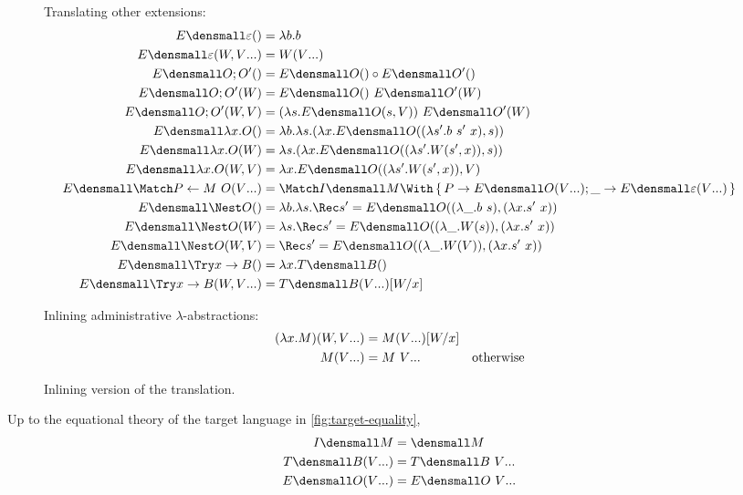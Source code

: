 \documentclass[runningheads]{llncs}
\begin{document}
\begin{figure}
Translating other extensions:
\begin{align*}
  E\den{\varepsilon}()
  &=
  \lambda b. b
  \\
  E\den{\varepsilon}(W, \many{V})
  &=
  W(\many{V})
  \\
  E\den{O; O'}()
  &=
  E\den{O}() \comp E\den{O'}()
  \\
  E\den{O; O'}(W)
  &=
  E\den{O}() ~ E\den{O'}(W)
  \\
  E\den{O; O'}(W, V)
  &=
  (\lambda s. E\den{O}(s, V)) ~ E\den{O'}(W)
  \\
  E\den{\lambda x. O}()
  &=
  \lambda b. \lambda s. (\lambda x. E\den{O}((\lambda s'. b ~ s' ~ x), s))
  \\
  E\den{\lambda x. O}(W)
  &=
  \lambda s. (\lambda x. E\den{O}((\lambda s'. W(s', x)), s))
  \\
  E\den{\lambda x. O}(W, V)
  &=
  \lambda x. E\den{O}((\lambda s'. W(s', x)), V)
  \\
  E\den{\Match P \gets M ~ O}(\many{V})
  &=
  \Match I\den{M} \With
  \set{P \to E\den{O}(\many{V}); \_ \to E\den{\varepsilon}(\many{V})}
  \\
  E\den{\Nest O}()
  &=
  \lambda b. \lambda s. \Rec s' = E\den{O}((\lambda \_. b ~ s), (\lambda x. s' ~ x))
  \\
  E\den{\Nest O}(W)
  &=
  \lambda s. \Rec s' = E\den{O}((\lambda \_. W(s)), (\lambda x. s' ~ x))
  \\
  E\den{\Nest O}(W, V)
  &=
  \Rec s' = E\den{O}((\lambda \_. W(V)), (\lambda x. s' ~ x))
  \\
  E\den{\Try x \to B}()
  &=
  \lambda x. T\den{B}()
  \\
  E\den{\Try x \to B}(W, \many{V})
  &=
  T\den{B}(\many{V})\subst{x}{W}
\end{align*}

Inlining administrative $\lambda$-abstractions:
\begin{align*}
  (\lambda x. M)(W, \many{V})
  &=
  M(\many{V})\subst{x}{W}
  \\
  M(\many{V})
  &=
  M ~ \many{V}
  &
  \text{otherwise}
\end{align*}

\caption{Inlining version of the translation.}
\label{fig:inline-translation}
\end{figure}

\begin{proposition}
  Up to the equational theory of the target language in
  \cref{fig:target-equality},
  \begin{align*}
    I\den{M} &= \den{M}
    \\
    T\den{B}(\many{V}) &= T\den{B} ~ \many{V}
    \\
    E\den{O}(\many{V}) &= E\den{O} ~ \many{V}
  \end{align*}  
\end{proposition}
\end{document}
